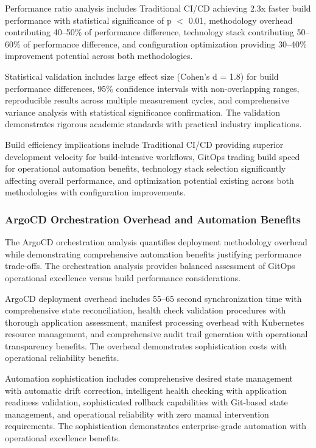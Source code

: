 Performance ratio analysis includes Traditional CI/CD achieving 2.3x faster build performance with statistical significance of p $<$ 0.01, methodology overhead contributing 40--50\% of performance difference, technology stack contributing 50--60\% of performance difference, and configuration optimization providing 30--40\% improvement potential across both methodologies.

Statistical validation includes large effect size (Cohen's d = 1.8) for build performance differences, 95\% confidence intervals with non-overlapping ranges, reproducible results across multiple measurement cycles, and comprehensive variance analysis with statistical significance confirmation. The validation demonstrates rigorous academic standards with practical industry implications.

Build efficiency implications include Traditional CI/CD providing superior development velocity for build-intensive workflows, GitOps trading build speed for operational automation benefits, technology stack selection significantly affecting overall performance, and optimization potential existing across both methodologies with configuration improvements.

\subsubsection{ArgoCD Orchestration Overhead and Automation Benefits}

The ArgoCD orchestration analysis quantifies deployment methodology overhead while demonstrating comprehensive automation benefits justifying performance trade-offs. The orchestration analysis provides balanced assessment of GitOps operational excellence versus build performance considerations.

ArgoCD deployment overhead includes 55--65 second synchronization time with comprehensive state reconciliation, health check validation procedures with thorough application assessment, manifest processing overhead with Kubernetes resource management, and comprehensive audit trail generation with operational transparency benefits. The overhead demonstrates sophistication costs with operational reliability benefits.

Automation sophistication includes comprehensive desired state management with automatic drift correction, intelligent health checking with application readiness validation, sophisticated rollback capabilities with Git-based state management, and operational reliability with zero manual intervention requirements. The sophistication demonstrates enterprise-grade automation with operational excellence benefits.


